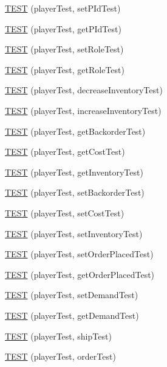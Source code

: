 \begin{DoxyCompactItemize}
\item 
\hyperlink{group__group1_gae741ae9791030192de7d721c93a13bd1}{T\+E\+ST} (player\+Test, set\+P\+Id\+Test)
\item 
\hyperlink{group__group1_ga5f70dd6a5d3871941af5c7aab63ee78f}{T\+E\+ST} (player\+Test, get\+P\+Id\+Test)
\item 
\hyperlink{group__group1_gaec2fa9415afb1e6ea1a51b87946d7d33}{T\+E\+ST} (player\+Test, set\+Role\+Test)
\item 
\hyperlink{group__group1_ga16480984296f888db0a3754b1ef28ead}{T\+E\+ST} (player\+Test, get\+Role\+Test)
\item 
\hyperlink{group__group1_gabd2115485a1c4d297b77ef378f7c49e5}{T\+E\+ST} (player\+Test, decrease\+Inventory\+Test)
\item 
\hyperlink{group__group1_ga21e07664ff2e1e5b18dc5157a7f69460}{T\+E\+ST} (player\+Test, increase\+Inventory\+Test)
\item 
\hyperlink{group__group1_ga8e511a4ee9c7bca45280ada45bf604af}{T\+E\+ST} (player\+Test, get\+Backorder\+Test)
\item 
\hyperlink{group__group1_ga4ad9313eebacc240151baec8ff51463d}{T\+E\+ST} (player\+Test, get\+Cost\+Test)
\item 
\hyperlink{group__group1_gafca31a7c90ab705132fee1865c93b0aa}{T\+E\+ST} (player\+Test, get\+Inventory\+Test)
\item 
\hyperlink{group__group1_gabbb58f0693c71f814d008f249c62f0d0}{T\+E\+ST} (player\+Test, set\+Backorder\+Test)
\item 
\hyperlink{group__group1_gaac7c46446cc5f1a91bc29cc5b6c4675f}{T\+E\+ST} (player\+Test, set\+Cost\+Test)
\item 
\hyperlink{group__group1_ga01d81b8c2f8950e855f2d0086acbd722}{T\+E\+ST} (player\+Test, set\+Inventory\+Test)
\item 
\hyperlink{group__group1_ga8fd27440e6581d8a734cdfdbbbc6f83f}{T\+E\+ST} (player\+Test, set\+Order\+Placed\+Test)
\item 
\hyperlink{group__group1_gab4bed2eb3526372ad33bfe2e7555b635}{T\+E\+ST} (player\+Test, get\+Order\+Placed\+Test)
\item 
\hyperlink{group__group1_gad11664b855d5e016ed1294f09ed0ce90}{T\+E\+ST} (player\+Test, set\+Demand\+Test)
\item 
\hyperlink{group__group1_ga70081cc20b7aaeb27a4f8c1eb3ff65a5}{T\+E\+ST} (player\+Test, get\+Demand\+Test)
\item 
\hyperlink{group__group1_ga2eceb45b45bcbec68c76df2065d99ad3}{T\+E\+ST} (player\+Test, ship\+Test)
\item 
\hyperlink{group__group1_ga2bc551dcf717827b20b4024e4f272857}{T\+E\+ST} (player\+Test, order\+Test)
\end{DoxyCompactItemize}


